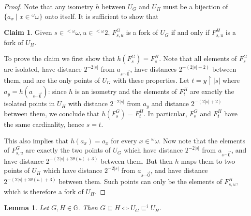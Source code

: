 \documentclass{amsart}
\newtheorem{lemma}[theorem]{Lemma}
\theoremstyle{definition}
\newtheorem{claim}{Claim}[theorem]
\theoremstyle{remark}
\begin{document}
\begin{proof}
Note that  any isometry  $h$ between $U_G$ and $U_H$ must be a bijection of  $\{ a_x \mid x \in {}^\omega \omega \}$ onto itself. It is sufficient to show that

\begin{claim}
Given $s \in {}^{<\omega} \omega, u \in {}^{<\omega} 2$, $F^G_{s,u}$ is a fork of $U_G$ if and only if $F^H_{s,u}$
is a fork of $U_H$.
\end{claim}

To prove the claim we first show that $h(F^G_s) = F^H_s$. Note that all elements of $F^G_s$
are isolated, have distance $2^{-2 |s|}$ from $a_{s {}^\smallfrown \vec{0}}$, have distances
$2^{-(2|s|+2)}$ between them, and are the only points of $U_G$ with
these properties. Let $t = y \restriction |s|$ where $a_y = h(a_{s {}^\smallfrown \vec{0}})$: since $h$ is an isometry and the elements
of $F^H_t$ are exactly the isolated points in $U_H$ with distance
$2^{-2 |s|}$ from $a_y$ and distance $2^{-(2|s|+2)}$ between them, we
conclude that $h(F^G_s) = F^H_t$. In particular, $F^G_s$ and $F^H_t$ have the same cardinality, hence $s=t$.

This also implies that $h(a_x) = a_x$ for every $x \in {}^\omega \omega$.
Now note that the elements of
$F^G_{s,u}$ are exactly the two points of $U_G$ which have
distance $2^{-2 |s|}$ from $a_{s {}^\smallfrown \vec{0}}$, and have distance
$2^{-(2|s|+2\theta(u)+3)}$ between them. But then $h$ maps them to two points of $U_H$ which have distance $2^{-2 |s|}$ from
$a_{s {}^\smallfrown \vec{0}}$, and have distance $2^{-(2|s|+2\theta(u)+3)}$ between them. Such points can only be the elements of $F^H_{s,u}$, which is therefore a fork of $U_H$.
\end{proof}

\begin{lemma} \label{lemmaisometry2}
Let $G,H \in {\mathbb{G}}$. Then
 $G \sqsubseteq H \iff U_G \sqsubseteq^i U_H$.
\end{lemma}
\end{document}
